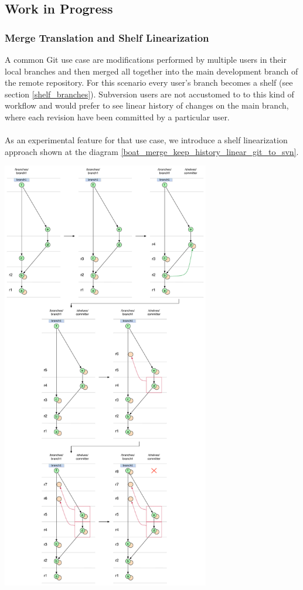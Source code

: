 \subsection{Work in Progress}

\subsubsection{Merge Translation and Shelf Linearization}

A common Git use case are modifications performed by multiple users in their local branches and then merged all together into the main development branch of the remote repository. 
For this scenario every user's branch becomes a shelf (see section \ref{shelf_branches}). Subversion users are not accustomed to
to this kind of workflow and would prefer to see linear history of changes on the main branch, where each revision have been committed by a particular user.
\\\\
As an experimental feature for that use case, we introduce a shelf linearization approach shown at the diagram \ref{boat_merge_keep_history_linear_git_to_svn}.
\begin{center}
\includegraphics[height=18.9cm]{img/diagrams/boat_merge_keep_history_linear_git_to_svn.pdf}%
\label{boat_merge_keep_history_linear_git_to_svn}%
\end{center}


